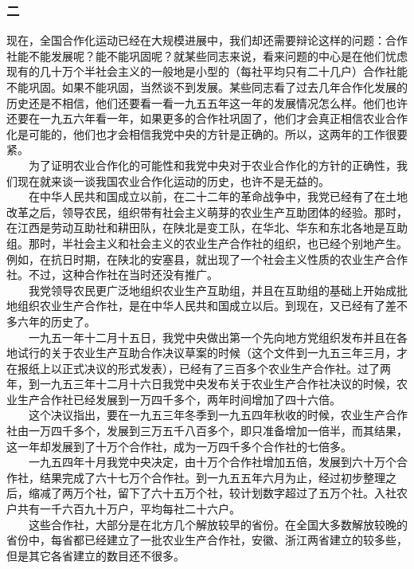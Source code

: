 \documentclass[cn,11pt,chinese]{elegantbook}
\def\myformat#1{\hfil\hfil #1}
\begin{document}
\subsubsection*{\myformat{二}}
现在，全国合作化运动已经在大规模进展中，我们却还需要辩论这样的问题：合作社能不能发展呢？能不能巩固呢？就某些同志来说，看来问题的中心是在他们忧虑现有的几十万个半社会主义的一般地是小型的（每社平均只有二十几户）合作社能不能巩固。如果不能巩固，当然谈不到发展。某些同志看了过去几年合作化发展的历史还是不相信，他们还要看一看一九五五年这一年的发展情况怎么样。他们也许还要在一九五六年看一年，如果更多的合作社巩固了，他们才会真正相信农业合作化是可能的，他们也才会相信我党中央的方针是正确的。所以，这两年的工作很要紧。\\
　　为了证明农业合作化的可能性和我党中央对于农业合作化的方针的正确性，我们现在就来谈一谈我国农业合作化运动的历史，也许不是无益的。\\
　　在中华人民共和国成立以前，在二十二年的革命战争中，我党已经有了在土地改革之后，领导农民，组织带有社会主义萌芽的农业生产互助团体的经验。那时，在江西是劳动互助社和耕田队，在陕北是变工队，在华北、华东和东北各地是互助组。那时，半社会主义和社会主义的农业生产合作社的组织，也已经个别地产生。例如，在抗日时期，在陕北的安塞县，就出现了一个社会主义性质的农业生产合作社。不过，这种合作社在当时还没有推广。\\
　　我党领导农民更广泛地组织农业生产互助组，并且在互助组的基础上开始成批地组织农业生产合作社，是在中华人民共和国成立以后。到现在，又已经有了差不多六年的历史了。\\
　　一九五一年十二月十五日，我党中央做出第一个先向地方党组织发布并且在各地试行的关于农业生产互助合作决议草案的时候（这个文件到一九五三年三月，才在报纸上以正式决议的形式发表），已经有了三百多个农业生产合作社。过了两年，到一九五三年十二月十六日我党中央发布关于农业生产合作社决议的时候，农业生产合作社已经发展到一万四千多个，两年时间增加了四十六倍。\\
　　这个决议指出，要在一九五三年冬季到一九五四年秋收的时候，农业生产合作社由一万四千多个，发展到三万五千八百多个，即只准备增加一倍半，而其结果，这一年却发展到了十万个合作社，成为一万四千多个合作社的七倍多。\\
　　一九五四年十月我党中央决定，由十万个合作社增加五倍，发展到六十万个合作社，结果完成了六十七万个合作社。到一九五五年六月为止，经过初步整理之后，缩减了两万个社，留下了六十五万个社，较计划数字超过了五万个社。入社农户共有一千六百九十万户，平均每社二十六户。\\
　　这些合作社，大部分是在北方几个解放较早的省份。在全国大多数解放较晚的省份中，每省都已经建立了一批农业生产合作社，安徽、浙江两省建立的较多些，但是其它各省建立的数目还不很多。\\
\end{document}
